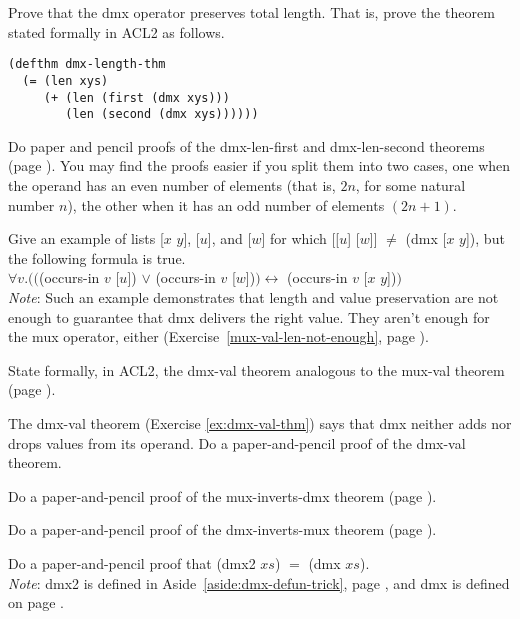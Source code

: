 \begin{ExerciseList}
\Exercise
Prove that the \textsf{dmx} operator preserves total length.
That is, prove the theorem
stated formally in ACL2 as follows.

\label{thm:dmx-length}
\begin{Verbatim}
(defthm dmx-length-thm
  (= (len xys)
     (+ (len (first (dmx xys)))
        (len (second (dmx xys))))))
\end{Verbatim}

\Exercise
Do paper and pencil proofs of the dmx-len-first and dmx-len-second
theorems (page \pageref{thm:dmx-length-first-second}).
You may find the proofs easier if you split them into
two cases, one when the operand has an even number of elements
(that is, $2n$, for some natural number $n$),
the other when it has an odd number of elements $(2n+1)$.

\Exercise\label{dmx-val-len-not-enough}
Give an example of lists
\textsf{[$x$ $y$]}, \textsf{[$u$]}, and \textsf{[$w$]} for which
\textsf{[[$u$] [$w$]]} $\neq$ \textsf{(dmx [$x$ $y$])}, but the following formula is true.\\
\hspace*{1cm}$\forall v.(($\textsf{(occurs-in $v$ [$u$])} $\vee$ \textsf{(occurs-in $v$ [$w$])}$)
\leftrightarrow$ \textsf{(occurs-in $v$ [$x$ $y$])}$)$\\
\emph{Note}: Such an example demonstrates that length and value
preservation are not enough to guarantee that \textsf{dmx} delivers the right value.
They aren't enough for the \textsf{mux} operator, either
(Exercise~\ref{mux-val-len-not-enough}, page \pageref{mux-val-len-not-enough}).

\Exercise [label={ex:dmx-val-thm}]
State formally, in ACL2, the dmx-val theorem
analogous to the mux-val theorem (page \pageref{defthm:mux-val}).

\Exercise
The dmx-val theorem (Exercise \ref{ex:dmx-val-thm})
says that \textsf{dmx} neither adds nor drops values from its operand.
Do a paper-and-pencil proof of the dmx-val theorem.

\Exercise {}
Do a paper-and-pencil proof of the mux-inverts-dmx theorem
(page \pageref{thm:mux-inverts-dmx}).

\Exercise
Do a paper-and-pencil proof of the dmx-inverts-mux theorem
(page \pageref{thm:dmx-inverts-mux}).

\Exercise
\label{dmx2-eq-dmx}
Do a paper-and-pencil proof that
\textsf{(dmx2 $xs$)} $=$ \textsf{(dmx $xs$)}.\\
\emph{Note}: \textsf{dmx2} is defined in
Aside~\ref{aside:dmx-defun-trick}, page \pageref{aside:dmx-defun-trick},
and \textsf{dmx} is defined on page \pageref{dmx-defun}.

\end{ExerciseList}

